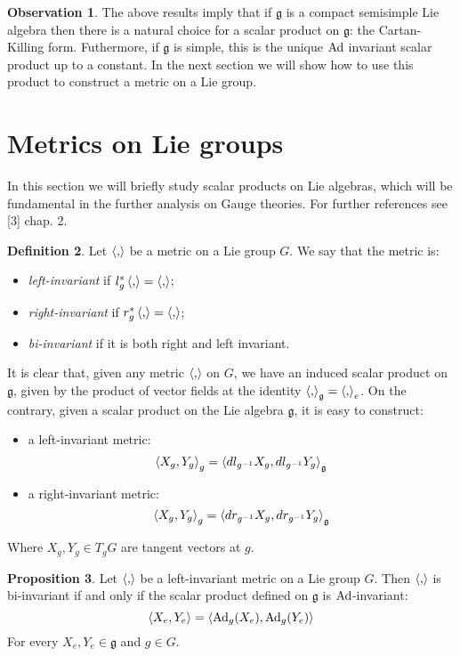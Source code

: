 \documentclass[12pt,a4paper]{report}
\theoremstyle{definition}
\newtheorem{Def}{Definition}[chapter]
\theoremstyle{Theorem}
\newtheorem{Prop}[Def]{Proposition}
\theoremstyle{definition}
\theoremstyle{definition}
\newtheorem{Obs}[Def]{Observation}
\begin{document}
	\begin{Obs}
		The above results imply that if $\mathfrak{g}$ is a compact semisimple Lie algebra then there is a natural choice for a scalar product on $\mathfrak{g}$: the Cartan-Killing form. Futhermore, if $\mathfrak{g}$ is simple, this is the unique $\hbox{Ad}$ invariant scalar product up to a constant. In the next section we will show how to use this product to construct a metric on a Lie group.
	\end{Obs}
	\section{Metrics on Lie groups}
	In this section we will briefly study scalar products on Lie algebras, which will be fundamental in the further analysis on Gauge theories. For further references see [3] chap. 2.
	\begin{Def}
		Let $\braket{,}$ be a metric on a Lie group $G$. We say that the metric is:
		\begin{itemize}
			\item \textit{left-invariant} if $l^*_g\braket{,}=\braket{,}$;
			\item \textit{right-invariant} if $r^*_g\braket{,}=\braket{,}$;
			\item \textit{bi-invariant} if it is both right and left invariant.
		\end{itemize}
	\end{Def}
	It is clear that, given any metric $\braket{,}$ on $G$, we have an induced scalar product on $\mathfrak{g}$, given by the product of vector fields at the identity $\braket{,}_\mathfrak{g}=\braket{,}_e$. On the contrary, given a scalar product on the Lie algebra $\mathfrak{g}$, it is easy to construct:
	\begin{itemize}
		\item a left-invariant metric:
		$$\braket{X_g,Y_g}_g=\braket{dl_{g^{-1}}X_g,dl_{g^{-1}}Y_g}_\mathfrak{g}$$
		\item a right-invariant metric:
		$$\braket{X_g,Y_g}_g=\braket{dr_{g^{-1}}X_g,dr_{g^{-1}}Y_g}_\mathfrak{g}$$
	\end{itemize}
	Where $X_g,Y_g\in T_gG$ are tangent vectors at $g$.
	\begin{Prop}
		Let $\braket{,}$ be a left-invariant metric on a Lie group $G$. Then $\braket{,}$ is bi-invariant if and only if the scalar product defined on $\mathfrak{g}$ is $\hbox{Ad}$-invariant:
		$$\braket{X_e,Y_e}=\braket{\hbox{Ad}_g(X_e),\hbox{Ad}_g(Y_e)}$$
		For every $X_e,Y_e\in\mathfrak{g}$ and $g\in G$.
	\end{Prop}
\end{document}
